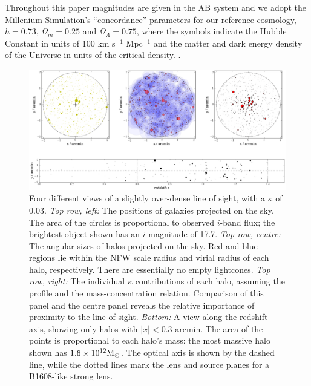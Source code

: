 \documentclass[useAMS,usenatbib]{mn2e}
\begin{document}
Throughout this paper magnitudes are given in the AB system and
we adopt the Millenium Simulation's ``concordance'' parameters for our reference cosmology, \ie
$h=0.73$, $\Omega_m=0.25$ and $\Omega_\Lambda=0.75$, where the symbols indicate
the Hubble Constant in units of 100 km s$^{-1}$ Mpc$^{-1}$ and the matter and
dark energy density of the Universe in units of the critical density.
.%



\begin{figure}
\includegraphics[width=\textwidth]{figs/viewofalightcone.eps}
\caption[magcut]{Four different views of a slightly over-dense \MS line
of sight, with a $\kappa$ of 0.03. 
{\it Top row, left:} The positions of galaxies projected on the sky. The area
of the circles is proportional to observed $i$-band flux; the brightest
object shown has an $i$ magnitude of 17.7. 
{\it Top row, centre:} The angular sizes of halos projected on the sky.
Red and blue regions lie within the NFW scale radius and virial radius
of each halo, respectively. There are essentially no empty lightcones. 
{\it Top row, right:} The individual $\kappa$ contributions of
each halo, assuming the \citet{BMO} profile and the \citet{Neto2007}
mass-concentration relation. Comparison of
this panel and the centre panel reveals the relative importance of
proximity to the line of sight.
{\it Bottom:} A view along the redshift axis, showing only halos with
$|x|<0.3$ arcmin. The area of the points is proportional to each halo's
mass: the most massive halo shown has $1.6\times10^{12}\Msun$. The
optical axis is shown by the dashed line, while the dotted lines mark
the lens and source planes for a B1608-like strong lens.}
\label{fig:lightcone}
\end{figure}



\end{document}
